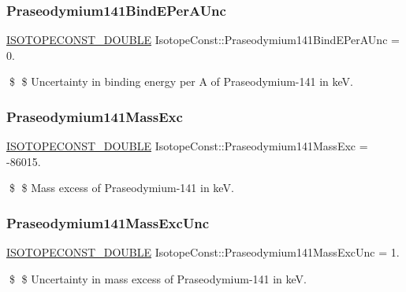 \subsubsection{\texorpdfstring{Praseodymium141\+Bind\+E\+Per\+A\+Unc}{Praseodymium141BindEPerAUnc}}
{\footnotesize\ttfamily \mbox{\hyperlink{group___isotope_const-_macros_ga8f45a7272ce02c0b4c65c44636ed719a}{I\+S\+O\+T\+O\+P\+E\+C\+O\+N\+S\+T\+\_\+\+D\+O\+U\+B\+LE}} Isotope\+Const\+::\+Praseodymium141\+Bind\+E\+Per\+A\+Unc = 0.}

\$ \$ Uncertainty in binding energy per A of Praseodymium-\/141 in keV. \mbox{\label{group___isotope_const-_praseodymium-_pr141_gac8ec4c82c1f0694f5b8810b97c8437d4}} 
\subsubsection{\texorpdfstring{Praseodymium141\+Mass\+Exc}{Praseodymium141MassExc}}
{\footnotesize\ttfamily \mbox{\hyperlink{group___isotope_const-_macros_ga8f45a7272ce02c0b4c65c44636ed719a}{I\+S\+O\+T\+O\+P\+E\+C\+O\+N\+S\+T\+\_\+\+D\+O\+U\+B\+LE}} Isotope\+Const\+::\+Praseodymium141\+Mass\+Exc = -\/86015.}

\$ \$ Mass excess of Praseodymium-\/141 in keV. \mbox{\label{group___isotope_const-_praseodymium-_pr141_ga59ac3aa2f21373a7de8e9f86f5e692f7}} 
\subsubsection{\texorpdfstring{Praseodymium141\+Mass\+Exc\+Unc}{Praseodymium141MassExcUnc}}
{\footnotesize\ttfamily \mbox{\hyperlink{group___isotope_const-_macros_ga8f45a7272ce02c0b4c65c44636ed719a}{I\+S\+O\+T\+O\+P\+E\+C\+O\+N\+S\+T\+\_\+\+D\+O\+U\+B\+LE}} Isotope\+Const\+::\+Praseodymium141\+Mass\+Exc\+Unc = 1.}

\$ \$ Uncertainty in mass excess of Praseodymium-\/141 in keV. \mbox{\label{group___isotope_const-_praseodymium-_pr141_ga6291513194046ba62fe70d32692a7718}} 
